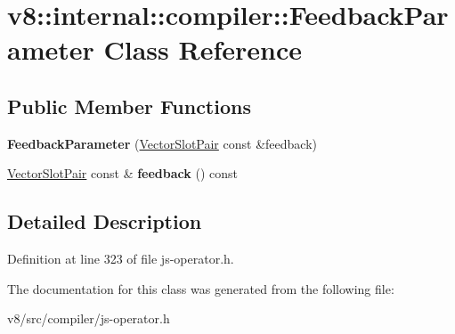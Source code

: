 \hypertarget{classv8_1_1internal_1_1compiler_1_1FeedbackParameter}{}\section{v8\+:\+:internal\+:\+:compiler\+:\+:Feedback\+Parameter Class Reference}
\label{classv8_1_1internal_1_1compiler_1_1FeedbackParameter}
\subsection*{Public Member Functions}
\begin{DoxyCompactItemize}
\item 
\mbox{\label{classv8_1_1internal_1_1compiler_1_1FeedbackParameter_a676059af8a9df67ec7ae60c9c1235952}} 
{\bfseries Feedback\+Parameter} (\mbox{\hyperlink{classv8_1_1internal_1_1VectorSlotPair}{Vector\+Slot\+Pair}} const \&feedback)
\item 
\mbox{\label{classv8_1_1internal_1_1compiler_1_1FeedbackParameter_af2c225aafbd570581bc26c4a007700ab}} 
\mbox{\hyperlink{classv8_1_1internal_1_1VectorSlotPair}{Vector\+Slot\+Pair}} const  \& {\bfseries feedback} () const
\end{DoxyCompactItemize}


\subsection{Detailed Description}


Definition at line 323 of file js-\/operator.\+h.



The documentation for this class was generated from the following file\+:\begin{DoxyCompactItemize}
\item 
v8/src/compiler/js-\/operator.\+h\end{DoxyCompactItemize}
